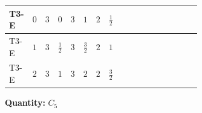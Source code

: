 \documentclass[8pt]{article}
\begin{document}
\begin{landscape}
\begin{longtable}{@{}llcccccc >{\raggedright\arraybackslash}p{0.21\linewidth} >{\raggedright\arraybackslash}p{0.21\linewidth} >{\raggedright\arraybackslash}p{0.21\linewidth}@{}}
\midrule
T3-E & $0$ & $3$ & $0$ & $3$ & $1$ & $2$ & $\frac{1}{2}$ & \scriptsize\adjustbox{max width=\linewidth}{$\begin{gathered} - 3 C_{5} g_{2}^{2}\end{gathered}$} & \scriptsize\adjustbox{max width=\linewidth}{$\begin{gathered} 2 C_{5} \lambda_1\end{gathered}$} & \scriptsize\adjustbox{max width=\linewidth}{$\begin{gathered} - C_{5} Y_e Y_e^\dagger\end{gathered}$} \\
\midrule
T3-E & $1$ & $3$ & $\frac{1}{2}$ & $3$ & $\frac{3}{2}$ & $2$ & $1$ & \scriptsize\adjustbox{max width=\linewidth}{$\begin{gathered} - 3 C_{5} g_{2}^{2}\end{gathered}$} & \scriptsize\adjustbox{max width=\linewidth}{$\begin{gathered} 2 C_{5} \lambda_1\end{gathered}$} & \scriptsize\adjustbox{max width=\linewidth}{$\begin{gathered} - C_{5} Y_e Y_e^\dagger\end{gathered}$} \\
\midrule
T3-E & $2$ & $3$ & $1$ & $3$ & $2$ & $2$ & $\frac{3}{2}$ & \scriptsize\adjustbox{max width=\linewidth}{$\begin{gathered} - 3 C_{5} g_{2}^{2}\end{gathered}$} & \scriptsize\adjustbox{max width=\linewidth}{$\begin{gathered} 2 C_{5} \lambda_1\end{gathered}$} & \scriptsize\adjustbox{max width=\linewidth}{$\begin{gathered} - C_{5} Y_e Y_e^\dagger\end{gathered}$} \\
\midrule
\bottomrule
\end{longtable}
\clearpage
\noindent\textbf{Quantity: }$C_5$\par\smallskip

\end{landscape}
\end{document}

